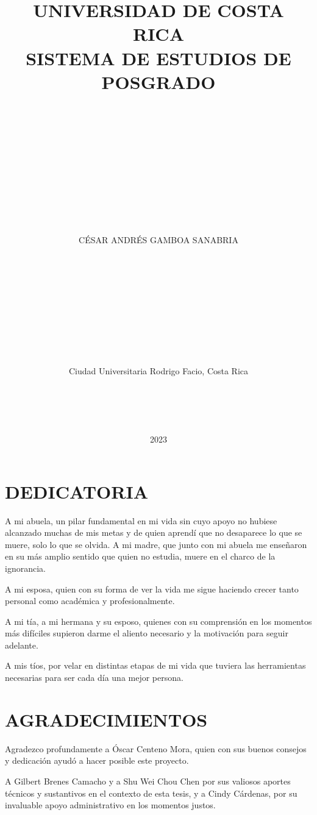 \documentclass[
]{article}
\title{UNIVERSIDAD DE COSTA RICA\\
SISTEMA DE ESTUDIOS DE POSGRADO\\
\strut \\
\strut \\
\strut \\}
\subtitle{LA SOBREPARAMETRIZACIÓN EN EL ARIMA: UNA APLICACIÓN A DATOS
COSTARRICENSES\\
\strut \\
\strut \\
\strut \\
\strut \\
Tesis sometida a la consideración de la Comisión del Programa de
Estudios de Posgrado en Estadística para optar por el grado y título de
Maestría Académica en Estadística}
\author{\hfill\break
\hfill\break
\hfill\break
\hfill\break
\hfill\break
CÉSAR ANDRÉS GAMBOA SANABRIA\\
\strut \\
\strut \\
\strut \\
\strut \\
\strut \\
Ciudad Universitaria Rodrigo Facio, Costa Rica\\
\strut \\
\strut \\}
\date{2023}
\begin{document}
\maketitle

\cleardoublepage

\newpage

\section*{DEDICATORIA}
\pagestyle{fancy}
\setcounter{page}{2}

A mi abuela, un pilar fundamental en mi vida sin cuyo apoyo no hubiese
alcanzado muchas de mis metas y de quien aprendí que no desaparece lo
que se muere, solo lo que se olvida. A mi madre, que junto con mi abuela
me enseñaron en su más amplio sentido que quien no estudia, muere en el
charco de la ignorancia.

A mi esposa, quien con su forma de ver la vida me sigue haciendo crecer
tanto personal como académica y profesionalmente.

A mi tía, a mi hermana y su esposo, quienes con su comprensión en los
momentos más difíciles supieron darme el aliento necesario y la
motivación para seguir adelante.

A mis tíos, por velar en distintas etapas de mi vida que tuviera las
herramientas necesarias para ser cada día una mejor persona.

\cleardoublepage

\section*{AGRADECIMIENTOS}

Agradezco profundamente a Óscar Centeno Mora, quien con sus buenos
consejos y dedicación ayudó a hacer posible este proyecto.

A Gilbert Brenes Camacho y a Shu Wei Chou Chen por sus valiosos aportes
técnicos y sustantivos en el contexto de esta tesis, y a Cindy Cárdenas,
por su invaluable apoyo administrativo en los momentos justos.

\cleardoublepage

\end{document}
